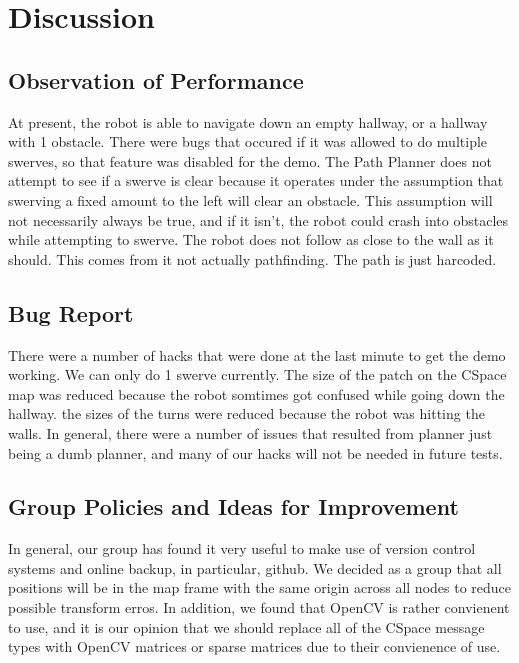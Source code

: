 \documentclass{article}
\begin{document}




\section{Discussion}
\subsection{Observation of Performance}

At present, the robot is able to navigate down an empty hallway, or a hallway with 1 obstacle.  There were bugs that occured if it was allowed to do multiple swerves, so that feature was disabled for the demo.
The Path Planner does not attempt to see if a swerve is clear because it operates under the assumption that swerving a fixed amount to the left will clear an obstacle.  
This assumption will not necessarily always be true, and if it isn't, the robot could crash into obstacles while attempting to swerve.
The robot does not follow as close to the wall as it should.  This comes from it not actually pathfinding.  The path is just harcoded.

\subsection{Bug Report}

There were a number of hacks that were done at the last minute to get the demo working.  We can only do 1 swerve currently. 
The size of the patch on the CSpace map was reduced because the robot somtimes got confused while going down the hallway.
the sizes of the turns were reduced because the robot was hitting the walls.
In general, there were a number of issues that resulted from planner just being a dumb planner, and many of our hacks will not be needed in future tests.

\subsection{Group Policies and Ideas for Improvement}

In general, our group has found it very useful to make use of version control systems and online backup, in particular, github.
We decided as a group that all positions will be in the map frame with the same origin across all nodes to reduce possible transform erros.
In addition, we found that OpenCV is rather convienent to use, and it is our opinion that we should replace all of the CSpace message types with OpenCV matrices or sparse matrices due to their convienence of use.
\end{document}
